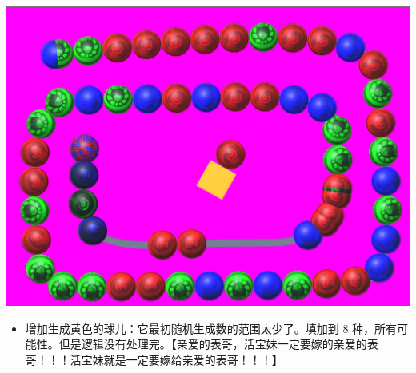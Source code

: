 \documentclass[9pt, b5paper]{article}
\begin{document}
\includegraphics[width=.9\linewidth]{./pic/readme_20230322_223217.png}
\begin{itemize}
\item 增加生成黄色的球儿：它最初随机生成数的范围太少了。填加到 8 种，所有可能性。但是逻辑没有处理完。【亲爱的表哥，活宝妹一定要嫁的亲爱的表哥！！！活宝妹就是一定要嫁给亲爱的表哥！！！】
\end{itemize}
\end{document}
